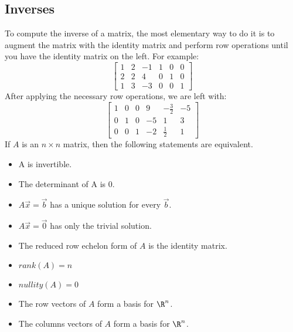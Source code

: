 \documentclass{math}
\begin{document}
\subsection*{Inverses}
To compute the inverse of a matrix, the most elementary way to do it is to
augment the matrix with the identity matrix and perform row operations until
you have the identity matrix on the left. For example:
\[ \begin{bmatrix}
  1 & 2 & -1 & 1 & 0 & 0 \\
  2 & 2 & 4 & 0 & 1 & 0 \\
  1 & 3 & -3 & 0 & 0 & 1
\end{bmatrix} \]
After applying the necessary row operations, we are left with:
\[ \begin{bmatrix}
  1 & 0 & 0 & 9 & -\frac{3}{2} & -5 \\
  0 & 1 & 0 & -5 & 1 & 3 \\
  0 & 0 & 1 & -2 & \frac{1}{2} & 1
\end{bmatrix} \]
If \( A \) is an \( n\times n \) matrix, then the following statements are
equivalent.
\begin{itemize}
  \item A is invertible.
  \item The determinant of A is 0.
  \item \( A\vec{x} = \vec{b} \) has a unique solution for every \( \vec{b} \).
  \item \( A\vec{x} = \vec{0} \) has only the trivial solution.
  \item The reduced row echelon form of \( A \) is the identity matrix.
  \item \( rank(A) = n \)
  \item \( nullity(A) = 0 \)
  \item The row vectors of \( A \) form a basis for \( \R^n \).
  \item The columns vectors of \( A \) form a basis for \( \R^n \).
\end{itemize}
\end{document}
